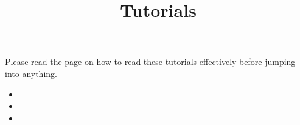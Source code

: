 
\title{Tutorials}
\date{}



Please read the \href{prelim.html}{page on how to read} these tutorials effectively before jumping into anything.

\begin{itemize}
\item {}
\item {}
\item {}
\end{itemize}



